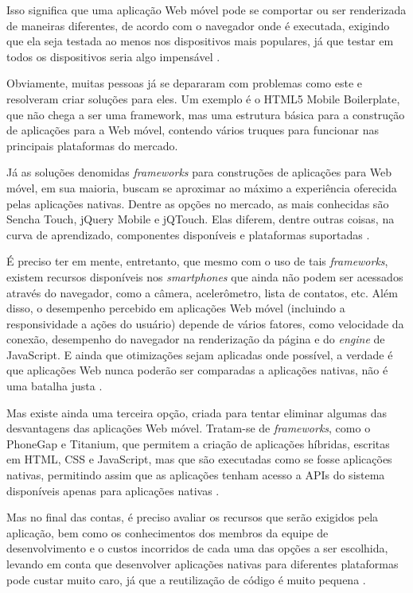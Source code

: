 \documentclass[diss]{template/setrem}
\begin{document}
Isso significa que uma aplicação Web móvel pode se comportar ou ser renderizada de maneiras diferentes, de acordo com o navegador onde é executada, exigindo que ela seja testada ao menos nos dispositivos mais populares, já que testar em todos os dispositivos seria algo impensável \citep{Fling2009}.

Obviamente, muitas pessoas já se depararam com problemas como este e resolveram criar soluções para eles. Um exemplo é o HTML5 Mobile Boilerplate, que não chega a ser uma framework, mas uma estrutura básica para a construção de aplicações para a Web móvel, contendo vários truques para funcionar nas principais plataformas do mercado.

Já as soluções denomidas \emph{frameworks} para construções de aplicações para Web móvel, em sua maioria, buscam se aproximar ao máximo a experiência oferecida pelas aplicações nativas. Dentre as opções no mercado, as mais conhecidas são Sencha Touch, jQuery Mobile e jQTouch. Elas diferem, dentre outras coisas, na curva de aprendizado, componentes disponíveis e plataformas suportadas \citep{Allen2010}.

É preciso ter em mente, entretanto, que mesmo com o uso de tais \emph{frameworks}, existem recursos disponíveis nos \emph{smartphones} que ainda não podem ser acessados através do navegador, como a câmera, acelerômetro, lista de contatos, etc. Além disso, o desempenho percebido em aplicações Web móvel (incluindo a responsividade a ações do usuário) depende de vários fatores, como velocidade da conexão, desempenho do navegador na renderização da página e do \emph{engine} de JavaScript. E ainda que otimizações sejam aplicadas onde possível, a verdade é que aplicações Web nunca poderão ser comparadas a aplicações nativas, não é uma batalha justa \citep{Fling2009}.

Mas existe ainda uma terceira opção, criada para tentar eliminar algumas das desvantagens das aplicações Web móvel. Tratam-se de \emph{frameworks}, como o PhoneGap e Titanium, que permitem a criação de aplicações híbridas, escritas em HTML, CSS e JavaScript, mas que são executadas como se fosse aplicações nativas, permitindo assim que as aplicações tenham acesso a APIs do sistema disponíveis apenas para aplicações nativas \citep{Allen2010}.

Mas no final das contas, é preciso avaliar os recursos que serão exigidos pela aplicação, bem como os conhecimentos dos membros da equipe de desenvolvimento e o custos incorridos de cada uma das opções a ser escolhida, levando em conta que desenvolver aplicações nativas para diferentes plataformas pode custar muito caro, já que a reutilização de código é muito pequena \citep{Fling2009}.
\end{document}
